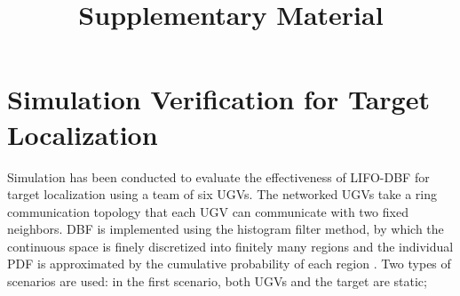 \documentclass[journal]{IEEEtranTIE}
\title{\LARGE \bf
	Supplementary Material}
\author{}
\theoremstyle{remark}
\newcommand{\todopara}[1]{\vspace{0px} %
	\todo[inline, color=black!10]{\textbf{[Paragraph:]} {#1}} %
}
\newcommand{\todonote}[1]{\vspace{0px} %
	\todo[inline, color=green!30]{\textbf{[Note:]} {#1}} %
}
\newcommand{\todoQ}[1]{\vspace{0px} %
	\todo[inline, color=orange!50]{\textbf{[Note:]} {#1}} %
}
\newcommand{\todohere}[1]{\hl{(\textbf{TODO:} #1)}}
\newcommand{\hidetodos}{
	\renewcommand{\todopara}[1]{}
	\renewcommand{\todonote}[1]{}
	\renewcommand{\todoQ}[1]{}
	\renewcommand{\todohere}[1]{}
	}
\begin{document}

\maketitle
\thispagestyle{empty}
\pagestyle{empty}



\section{Simulation Verification for Target Localization}
Simulation has been conducted to evaluate the effectiveness of LIFO-DBF for target localization using a team of six UGVs.
The networked UGVs take a ring communication topology that each UGV can communicate with two fixed neighbors.
DBF is implemented using the histogram filter method, by which the continuous space is finely discretized into finitely many regions and the individual PDF is approximated by the cumulative probability of each region \cite{thrun2005probabilistic}. 
Two types of scenarios are used: in the first scenario, both UGVs and the target are static;
\end{document}
